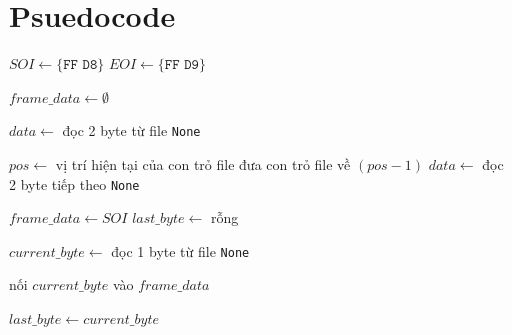 \section{Psuedocode}

\begin{algorithm}[H]
\caption{}
\begin{algorithmic}[1]
    \State $SOI \gets \texttt{\{FF D8\}}$
    \State $EOI \gets \texttt{\{FF D9\}}$

    \State $frame\_data \gets \emptyset$

    \State $data \gets$ đọc 2 byte từ file
        \State \Return \texttt{None}
    \EndIf

        \State $pos \gets$ vị trí hiện tại của con trỏ file
        \State đưa con trỏ file về $(pos - 1)$
        \State $data \gets$ đọc 2 byte tiếp theo
            \State \Return \texttt{None}
        \EndIf
    \EndWhile

    \State $frame\_data \gets SOI$
    \State $last\_byte \gets$ rỗng

        \State $current\_byte \gets$ đọc 1 byte từ file
            \State \Return \texttt{None}
        \EndIf

        \State nối $current\_byte$ vào $frame\_data$


        \State $last\_byte \gets current\_byte$
    \EndWhile
\EndProcedure
\end{algorithmic}
\end{algorithm}